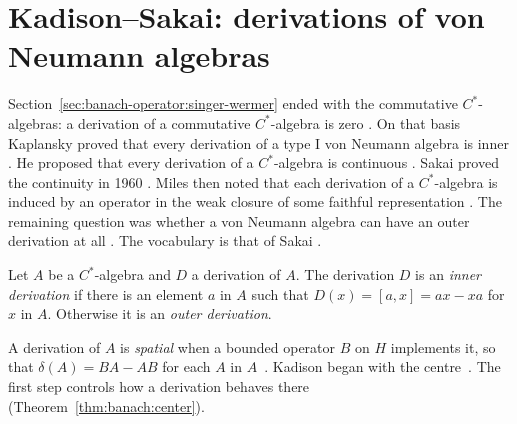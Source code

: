 \section{Kadison--Sakai: derivations of von Neumann algebras}\label{sec:banach-operator:kadison-sakai}

Section~\ref{sec:banach-operator:singer-wermer} ended with the commutative
$C^*$-algebras: a derivation of a commutative $C^*$-algebra is zero
\cite[p.~280]{Kadison1966}. On that basis Kaplansky proved that every
derivation of a type I von Neumann algebra is inner
\cite[p.~280]{Kadison1966}. He proposed
that every derivation of a $C^*$-algebra is continuous
\cite[p.~280]{Kadison1966}. Sakai proved the continuity in 1960
\cite[p.~31]{Sakai1960Kaplansky}. Miles then noted that each derivation of
a $C^*$-algebra is induced by an operator in the weak closure of some
faithful representation \cite[pp.~273--274]{Sakai1966}. The remaining
question was whether a von Neumann algebra can have an outer derivation at
all \cite[p.~273]{Sakai1966}. The vocabulary is that of Sakai
\cite[pp.~273--274]{Sakai1966}.

\begin{definition}\label{def:banach:inner}
Let $A$ be a $C^*$-algebra and $D$ a derivation of $A$. The derivation $D$
is an \emph{inner derivation} if there is an element $a$ in $A$ such that
$D(x)=[a,x]=ax-xa$ for $x$ in $A$. Otherwise it is an \emph{outer
derivation}.
\end{definition}

A derivation of $A$ is \emph{spatial} when a bounded operator $B$ on $H$
implements it, so that $\delta(A)=BA-AB$ for each $A$ in
$A$~\cite[p.~281]{Kadison1966}. Kadison began with the centre~\cite[Theorem~2, p.~281]{Kadison1966}. The first step
controls how a derivation behaves
 there~ (Theorem~\ref{thm:banach:center})\cite[Theorem~2, p.~281]{Kadison1966}.

